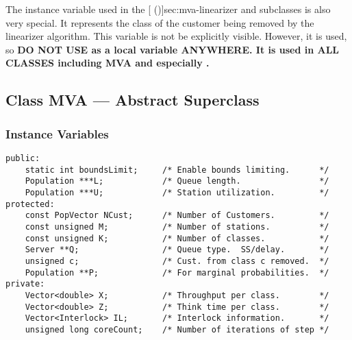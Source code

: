 The instance variable  used in the
[ (\Sec\Ref)]{sec:mva-linearizer} and subclasses
is also very special.  It represents the class of the customer being
removed by the linearizer algorithm.  This variable is not be
explicitly visible.  However, it is used, so \bf{DO NOT USE} 
as a local variable \bf{ANYWHERE}.  It is used in \bf{ALL CLASSES}
including MVA and especially .

\subsection{Class MVA --- Abstract Superclass}

\subsubsection{Instance Variables}
\label{sec:mva-ivars}

\begin{verbatim}
public:
    static int boundsLimit;     /* Enable bounds limiting.      */
    Population ***L;            /* Queue length.                */
    Population ***U;            /* Station utilization.         */
protected:
    const PopVector NCust;      /* Number of Customers.         */
    const unsigned M;           /* Number of stations.          */
    const unsigned K;           /* Number of classes.           */
    Server **Q;                 /* Queue type.  SS/delay.       */
    unsigned c;                 /* Cust. from class c removed.  */
    Population **P;             /* For marginal probabilities.  */
private:
    Vector<double> X;           /* Throughput per class.        */
    Vector<double> Z;           /* Think time per class.        */
    Vector<Interlock> IL;       /* Interlock information.       */
    unsigned long coreCount;    /* Number of iterations of step */
\end{verbatim}


